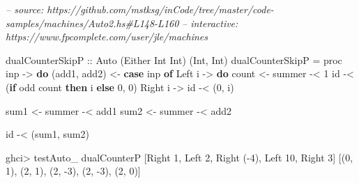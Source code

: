 \documentclass[]{article}
\newenvironment{Shaded}{}{}
\newcommand{\CommentTok}[1]{\textcolor[rgb]{0.38,0.63,0.69}{\textit{#1}}}
\newcommand{\DataTypeTok}[1]{\textcolor[rgb]{0.56,0.13,0.00}{#1}}
\newcommand{\DecValTok}[1]{\textcolor[rgb]{0.25,0.63,0.44}{#1}}
\newcommand{\FunctionTok}[1]{\textcolor[rgb]{0.02,0.16,0.49}{#1}}
\newcommand{\KeywordTok}[1]{\textcolor[rgb]{0.00,0.44,0.13}{\textbf{#1}}}
\newcommand{\NormalTok}[1]{#1}
\newcommand{\OtherTok}[1]{\textcolor[rgb]{0.00,0.44,0.13}{#1}}
\begin{document}
\begin{Shaded}
\begin{Highlighting}[]
\CommentTok{-- source: https://github.com/mstksg/inCode/tree/master/code-samples/machines/Auto2.hs#L148-L160}
\CommentTok{-- interactive: https://www.fpcomplete.com/user/jle/machines}

\OtherTok{dualCounterSkipP ::} \DataTypeTok{Auto}\NormalTok{ (}\DataTypeTok{Either} \DataTypeTok{Int} \DataTypeTok{Int}\NormalTok{) (}\DataTypeTok{Int}\NormalTok{, }\DataTypeTok{Int}\NormalTok{)}
\NormalTok{dualCounterSkipP }\FunctionTok{=}\NormalTok{ proc inp }\OtherTok{->} \KeywordTok{do}
\NormalTok{    (add1, add2) }\OtherTok{<-} \KeywordTok{case}\NormalTok{ inp }\KeywordTok{of}
                      \DataTypeTok{Left}\NormalTok{ i }\OtherTok{->} \KeywordTok{do}
\NormalTok{                        count }\OtherTok{<-}\NormalTok{ summer }\FunctionTok{-<} \DecValTok{1}
\NormalTok{                        id }\FunctionTok{-<}\NormalTok{ (}\KeywordTok{if}\NormalTok{ odd count }\KeywordTok{then}\NormalTok{ i }\KeywordTok{else} \DecValTok{0}\NormalTok{, }\DecValTok{0}\NormalTok{)}
                      \DataTypeTok{Right}\NormalTok{ i }\OtherTok{->}
\NormalTok{                        id }\FunctionTok{-<}\NormalTok{ (}\DecValTok{0}\NormalTok{, i)}

\NormalTok{    sum1 }\OtherTok{<-}\NormalTok{ summer }\FunctionTok{-<}\NormalTok{ add1}
\NormalTok{    sum2 }\OtherTok{<-}\NormalTok{ summer }\FunctionTok{-<}\NormalTok{ add2}

\NormalTok{    id }\FunctionTok{-<}\NormalTok{ (sum1, sum2)}
\end{Highlighting}
\end{Shaded}

\begin{Shaded}
\begin{Highlighting}[]
\NormalTok{ghci}\FunctionTok{>}\NormalTok{ testAuto_ dualCounterP [}\DataTypeTok{Right} \DecValTok{1}\NormalTok{, }\DataTypeTok{Left} \DecValTok{2}\NormalTok{, }\DataTypeTok{Right}\NormalTok{ (}\FunctionTok{-}\DecValTok{4}\NormalTok{), }\DataTypeTok{Left} \DecValTok{10}\NormalTok{, }\DataTypeTok{Right} \DecValTok{3}\NormalTok{]}
\NormalTok{[(}\DecValTok{0}\NormalTok{, }\DecValTok{1}\NormalTok{), (}\DecValTok{2}\NormalTok{, }\DecValTok{1}\NormalTok{), (}\DecValTok{2}\NormalTok{, }\FunctionTok{-}\DecValTok{3}\NormalTok{), (}\DecValTok{2}\NormalTok{, }\FunctionTok{-}\DecValTok{3}\NormalTok{), (}\DecValTok{2}\NormalTok{, }\DecValTok{0}\NormalTok{)]}
\end{Highlighting}
\end{Shaded}
\end{document}
